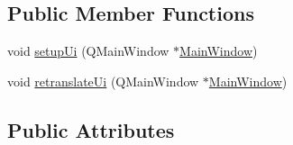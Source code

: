 \subsection*{Public Member Functions}
\begin{DoxyCompactItemize}
\item 
void \mbox{\hyperlink{classUi__MainWindow_acf4a0872c4c77d8f43a2ec66ed849b58}{setup\+Ui}} (Q\+Main\+Window $\ast$\mbox{\hyperlink{classMainWindow}{Main\+Window}})
\item 
void \mbox{\hyperlink{classUi__MainWindow_a097dd160c3534a204904cb374412c618}{retranslate\+Ui}} (Q\+Main\+Window $\ast$\mbox{\hyperlink{classMainWindow}{Main\+Window}})
\end{DoxyCompactItemize}
\subsection*{Public Attributes}
